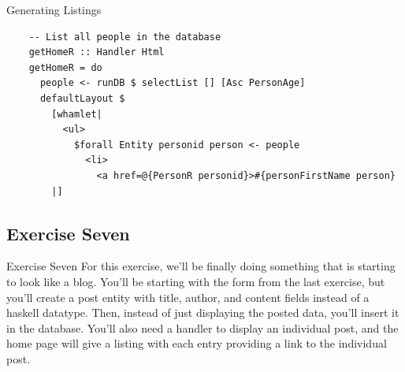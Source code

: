 \documentclass[pdf]{beamer}
\begin{document}
\begin{frame}[fragile]{Generating Listings}
  \begin{verbatim}
    -- List all people in the database
    getHomeR :: Handler Html
    getHomeR = do
      people <- runDB $ selectList [] [Asc PersonAge]
      defaultLayout $
        [whamlet|
          <ul>
            $forall Entity personid person <- people
              <li>
                <a href=@{PersonR personid}>#{personFirstName person}
        |]
  \end{verbatim}
\end{frame}

\subsection{Exercise Seven}
\begin{frame}{Exercise Seven}
  For this exercise, we'll be finally doing something that is starting
  to look like a blog. You'll be starting with the form from the last
  exercise, but you'll create a post entity with title, author, and
  content fields instead of a haskell datatype. Then, instead of just
  displaying the posted data, you'll insert it in the database. You'll
  also need a handler to display an individual post, and the home page
  will give a listing with each entry providing a link to the
  individual post.
\end{frame}

\end{document}

